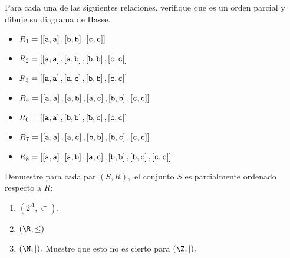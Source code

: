 \begin{problema}
	Para cada una de las siguientes relaciones, verifique que es un orden parcial y dibuje su diagrama de Hasse.
\end{problema}
\begin{itemize}
	\item $\displaystyle R_{1}= \left[\left[\text{\texttt{a}}, \text{\texttt{a}}\right], \left[\text{\texttt{b}}, \text{\texttt{b}}\right], \left[\text{\texttt{c}}, \text{\texttt{c}}\right]\right] $
	\item $\displaystyle R_{2}= \left[\left[\text{\texttt{a}}, \text{\texttt{a}}\right], \left[\text{\texttt{a}}, \text{\texttt{b}}\right], \left[\text{\texttt{b}}, \text{\texttt{b}}\right], \left[\text{\texttt{c}}, \text{\texttt{c}}\right]\right] $
	\item $\displaystyle R_{3}= \left[\left[\text{\texttt{a}}, \text{\texttt{a}}\right], \left[\text{\texttt{a}}, \text{\texttt{c}}\right], \left[\text{\texttt{b}}, \text{\texttt{b}}\right], \left[\text{\texttt{c}}, \text{\texttt{c}}\right]\right] $
	\item $\displaystyle R_{4}= \left[\left[\text{\texttt{a}}, \text{\texttt{a}}\right], \left[\text{\texttt{a}}, \text{\texttt{b}}\right], \left[\text{\texttt{a}}, \text{\texttt{c}}\right], \left[\text{\texttt{b}}, \text{\texttt{b}}\right], \left[\text{\texttt{c}}, \text{\texttt{c}}\right]\right] $
	\item $\displaystyle R_{6}= \left[\left[\text{\texttt{a}}, \text{\texttt{a}}\right], \left[\text{\texttt{b}}, \text{\texttt{b}}\right], \left[\text{\texttt{b}}, \text{\texttt{c}}\right], \left[\text{\texttt{c}}, \text{\texttt{c}}\right]\right] $
	\item $\displaystyle R_{7}= \left[\left[\text{\texttt{a}}, \text{\texttt{a}}\right], \left[\text{\texttt{a}}, \text{\texttt{c}}\right], \left[\text{\texttt{b}}, \text{\texttt{b}}\right], \left[\text{\texttt{b}}, \text{\texttt{c}}\right], \left[\text{\texttt{c}}, \text{\texttt{c}}\right]\right] $
	\item $\displaystyle R_{8}= \left[\left[\text{\texttt{a}}, \text{\texttt{a}}\right], \left[\text{\texttt{a}}, \text{\texttt{b}}\right], \left[\text{\texttt{a}}, \text{\texttt{c}}\right], \left[\text{\texttt{b}}, \text{\texttt{b}}\right], \left[\text{\texttt{b}}, \text{\texttt{c}}\right], \left[\text{\texttt{c}}, \text{\texttt{c}}\right]\right] $
\end{itemize}




\begin{problema}
	\label{lip:exmp:2.14}
	Demuestre para cada par $(S,R),$ el conjunto $S$ es parcialmente ordenado respecto a $R:$
	\begin{enumerate}%
		\item $(2^{A}, \subset).$ %
		
		\item $(\R, \leq )$
		\item $(\N, \mid).$  Muestre que esto no es cierto para $(\Z, \mid).$
	\end{enumerate}
	
\end{problema}
